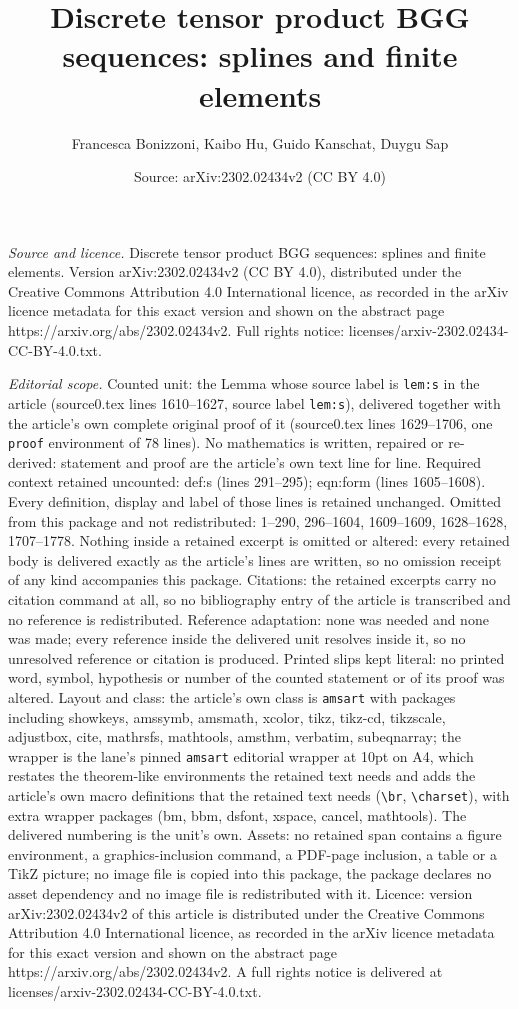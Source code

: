 \documentclass[10pt,a4paper]{amsart}
\title[Discrete tensor product BGG sequences: splines and finite el]{Discrete tensor product BGG sequences: splines and finite elements}
\author{Francesca Bonizzoni, Kaibo Hu, Guido Kanschat, Duygu Sap}
\date{Source: arXiv:2302.02434v2 (CC BY 4.0)}
\begin{document}
\maketitle

\noindent\emph{Source and licence.} Discrete tensor product BGG sequences: splines and finite elements. Version arXiv:2302.02434v2 (CC BY 4.0), distributed under the Creative Commons Attribution 4.0 International licence, as recorded in the arXiv licence metadata for this exact version and shown on the abstract page https://arxiv.org/abs/2302.02434v2. Full rights notice: licenses/arxiv-2302.02434-CC-BY-4.0.txt.\par\smallskip

\noindent\textit{Editorial scope.} Counted unit: the Lemma whose source label is \texttt{lem:s} in the article (source0.tex lines 1610--1627, source label \texttt{lem:s}), delivered together with the article's own complete original proof of it (source0.tex lines 1629--1706, one \texttt{proof} environment of 78 lines). No mathematics is written, repaired or re-derived: statement and proof are the article's own text line for line. Required context retained uncounted: def:s (lines 291--295); eqn:form (lines 1605--1608). Every definition, display and label of those lines is retained unchanged. Omitted from this package and not redistributed: 1--290, 296--1604, 1609--1609, 1628--1628, 1707--1778. Nothing inside a retained excerpt is omitted or altered: every retained body is delivered exactly as the article's lines are written, so no omission receipt of any kind accompanies this package. Citations: the retained excerpts carry no citation command at all, so no bibliography entry of the article is transcribed and no reference is redistributed. Reference adaptation: none was needed and none was made; every reference inside the delivered unit resolves inside it, so no unresolved reference or citation is produced. Printed slips kept literal: no printed word, symbol, hypothesis or number of the counted statement or of its proof was altered. Layout and class: the article's own class is \texttt{amsart} with packages including showkeys, amssymb, amsmath, xcolor, tikz, tikz-cd, tikzscale, adjustbox, cite, mathrsfs, mathtools, amsthm, verbatim, subeqnarray; the wrapper is the lane's pinned \texttt{amsart} editorial wrapper at 10pt on A4, which restates the theorem-like environments the retained text needs and adds the article's own macro definitions that the retained text needs (\texttt{\textbackslash br}, \texttt{\textbackslash charset}), with extra wrapper packages (bm, bbm, dsfont, xspace, cancel, mathtools). The delivered numbering is the unit's own. Assets: no retained span contains a figure environment, a graphics-inclusion command, a PDF-page inclusion, a table or a TikZ picture; no image file is copied into this package, the package declares no asset dependency and no image file is redistributed with it. Licence: version arXiv:2302.02434v2 of this article is distributed under the Creative Commons Attribution 4.0 International licence, as recorded in the arXiv licence metadata for this exact version and shown on the abstract page https://arxiv.org/abs/2302.02434v2. A full rights notice is delivered at licenses/arxiv-2302.02434-CC-BY-4.0.txt. 
\end{document}

